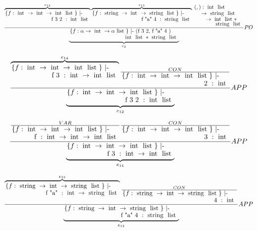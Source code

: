\begin{equation}
\frac
{
	\overbrace{
    		\splitfrac
    		{ 
    			\{ f: \tauoneint \} \text{ |- }
    		} 
    		{ 
    			\text{ f 3 2 }: \taufourint
    		}
	}^{e_{12}}
	\overbrace{
    		\splitfrac
    		{ 
    			\{ f: \tauonestring \} \text{ |- }
    		} 
    		{ 
    			\text{ f "a" 4 }: \taufourstring
    		}
	}^{e_{13}}
    		\splitfrac
    		{ 
            		\splitfrac
            		{ 
	    			(,):  \taufourint
            		} 
            		{ 
            			\rightarrow \taufourstring 
            		}
    		} 
    		{ 
            		\splitfrac
            		{ 
	    			\rightarrow \taufourint *
            		} 
            		{ 
            			\taufourstring 
            		}
    		}
}
{
	\underbrace{
    		\splitfrac
    		{ 
    			\{ f: \tauone \} \text{ |- (f 3 2, f "a" 4 ) }
    		} 
    		{ 
    			\tauintstringlisttuple
    		}
	}_{e_2}
}  
{
	PO
}
\end{equation}

\begin{equation}
\frac
{
	\overbrace{
    		\splitfrac
    		{ 
    			\{ f: \tauoneint \} \text{ |- }
    		} 
    		{ 
    			\text{ f 3 }: \tauthree \rightarrow \taufourint
    		}
	}^{e_{14}}
	\frac{
		CON
	}
	{
    		\splitfrac
    		{ 
    			\{ f: \tauoneint \} \text{ |- }
    		} 
    		{ 
    			\text{ 2 }: \tauthree
    		}
	}
}
{
	\underbrace{
    		\splitfrac
    		{ 
    			\{ f: \tauoneint \} \text{ |- }
    		} 
    		{ 
    			\text{ f 3 2 }: \taufourint
    		}
	}_{e_{12}}
}  
{
	APP
}
\end{equation}

\begin{equation}
\frac
{
	\frac{
		VAR
	}
	{
    		\splitfrac
    		{ 
    			\{ f: \tauoneint \} \text{ |- }
    		} 
    		{ 
    			\text{ f }: \tauoneint
    		}
	}
	\frac{
		CON
	}
	{
    		\splitfrac
    		{ 
    			\{ f: \tauoneint \} \text{ |- }
    		} 
    		{ 
    			\text{ 3 }: \tauthree
    		}
	}
}
{
	\underbrace{
    		\splitfrac
    		{ 
    			\{ f: \tauoneint \} \text{ |- }
    		} 
    		{ 
    			\text{ f 3 }: \tauthree \rightarrow \taufourint
    		}
	}_{e_{14}}
}  
{
	APP
}
\end{equation}

\begin{equation}
\frac
{
	\overbrace{
    		\splitfrac
    		{ 
    			\{ f: \tauonestring \} \text{ |- }
    		} 
    		{ 
    			\text{ f "a" }: \tauthree \rightarrow \taufourstring
    		}
	}^{e_{15}}
	\frac{
		CON
	}
	{
    		\splitfrac
    		{ 
    			\{ f: \tauonestring \} \text{ |- }
    		} 
    		{ 
    			\text{ 4 }: \tauthree
    		}
	}
}
{
	\underbrace{
    		\splitfrac
    		{ 
    			\{ f: \tauonestring \} \text{ |- }
    		} 
    		{ 
    			\text{ f "a" 4 }: \taufourstring
    		}
	}_{e_{13}}
}  
{
	APP
}
\end{equation}

